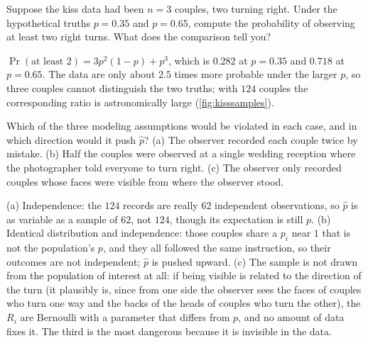 \begin{exercise}
Suppose the kiss data had been $n = 3$ couples, two turning right. Under the hypothetical truths $p = 0.35$ and $p = 0.65$, compute the probability of observing at least two right turns. What does the comparison tell you?
\end{exercise}
\begin{solution}
$\Pr(\text{at least } 2) = 3p^2(1-p) + p^3$, which is $0.282$ at $p = 0.35$ and $0.718$ at $p = 0.65$. The data are only about $2.5$ times more probable under the larger $p$, so three couples cannot distinguish the two truths; with $124$ couples the corresponding ratio is astronomically large (\cref{fig:kisssamples}).
\end{solution}

\begin{exercise}
Which of the three modeling assumptions would be violated in each case, and in which direction would it push $\hat{p}$? (a) The observer recorded each couple twice by mistake. (b) Half the couples were observed at a single wedding reception where the photographer told everyone to turn right. (c) The observer only recorded couples whose faces were visible from where the observer stood.
\end{exercise}
\begin{solution}
(a) Independence: the $124$ records are really $62$ independent observations, so $\hat{p}$ is as variable as a sample of $62$, not $124$, though its expectation is still $p$. (b) Identical distribution and independence: those couples share a $p_i$ near $1$ that is not the population's $p$, and they all followed the same instruction, so their outcomes are not independent; $\hat{p}$ is pushed upward. (c) The sample is not drawn from the population of interest at all: if being visible is related to the direction of the turn (it plausibly is, since from one side the observer sees the faces of couples who turn one way and the backs of the heads of couples who turn the other), the $R_i$ are Bernoulli with a parameter that differs from $p$, and no amount of data fixes it. The third is the most dangerous because it is invisible in the data.
\end{solution}
